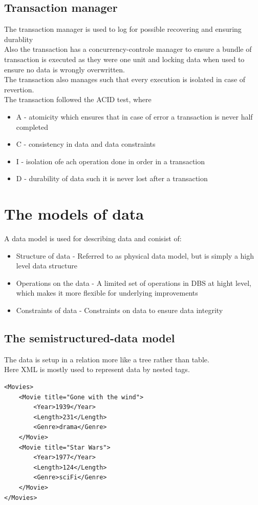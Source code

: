 \documentclass[12pt, a4paper]{article}
\begin{document}
				\subsection{Transaction manager}
					The transaction manager is used to log for possible recovering and ensuring durablity\\
					Also the transaction has a concurrency-controle manager to ensure a bundle of transaction is executed as they were one unit and locking data when used to ensure no data is wrongly overwritten.\\
					The transaction also manages such that every execution is isolated in case of revertion.\\
					The transaction followed the ACID test, where
					\begin{itemize}
						\item A - atomicity which ensures that in case of error a transaction is never half completed
						\item C - consistency in data and data constraints
						\item I - isolation ofe ach operation done in order in a transaction
						\item D - durability of data such it is never lost after a transaction
					\end{itemize}
	\section{The models of data}
		A data model is used for describing data and conisist of:
		\begin{itemize}
			\item Structure of data - Referred to as physical data model, but is simply a high level data structure
			\item Operations on the data - A limited set of operations in DBS at hight level, which makes it more flexible for underlying improvements
			\item Constraints of data - Constraints on data to ensure data integrity
		\end{itemize} 
		\subsection{The semistructured-data model}
			The data is setup in a relation more like a tree rather than table.\\
			Here XML is mostly used to represent data by nested tags.
			\begin{lstlisting}
<Movies>
	<Movie title="Gone with the wind">
		<Year>1939</Year>
		<Length>231</Length>
		<Genre>drama</Genre>
	</Movie>
	<Movie title="Star Wars">
		<Year>1977</Year>
		<Length>124</Length>
		<Genre>sciFi</Genre>
	</Movie>
</Movies>
			\end{lstlisting}
\end{document}

